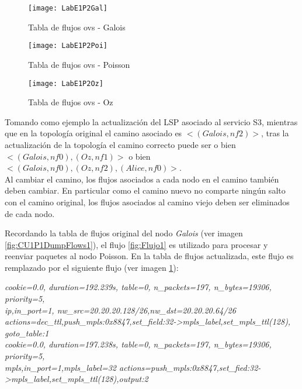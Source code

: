 \newpage
\begin{figure}[h] 
\centering    
\texttt{[image: LabE1P2Gal]}
\caption[Tabla de flujos ovs - Galois]{Tabla de flujos ovs - Galois}
\label{fig:CU1P2DumpFlows2}
\end{figure}

\begin{figure}[h] 
\centering    
\texttt{[image: LabE1P2Poi]}
\caption[Tabla de flujos ovs - Poisson]{Tabla de flujos ovs - Poisson}
\label{fig:CU1P2DumpFlows3}
\end{figure}

\newpage
\begin{figure}[ht!] 
\centering    
\texttt{[image: LabE1P2Oz]}
\caption[Tabla de flujos ovs - Oz]{Tabla de flujos ovs - Oz}
\label{fig:CU1P2DumpFlows4}
\end{figure}

Tomando como ejemplo la actualizaci\'on del LSP asociado al servicio S3, mientras que en la topolog\'ia original el camino asociado es $<(Galois, nf2)>$, tras la actualizaci\'on de la topolog\'ia el camino correcto puede ser o bien $<(Galois, nf0),(Oz, nf1)>$ o bien \\ $<(Galois, nf0), (Oz, nf2), (Alice, nf0)>$.\\

Al cambiar el camino, los flujos asociados a cada nodo en el camino tambi\'en deben cambiar. En particular como el camino nuevo no comparte ning\'un salto con el camino original, los flujos asociados al camino viejo deben ser eliminados de cada nodo.

Recordando la tabla de flujos original del nodo \textit{Galois} (ver imagen \ref{fig:CU1P1DumpFlows1}), el flujo \ref{fig:Flujo1} es utilizado para procesar y reenviar paquetes al nodo Poisson. En la tabla de flujos actualizada, este flujo es remplazado por el siguiente flujo (ver imagen \ref{fig:CU1P2DumpFlows2}):

\begin{center}
\textit{cookie=0.0, duration=192.239s, table=0, n\_packets=197, n\_bytes=19306, priority=5, \\
ip,in\_port=1, nw\_src=20.20.20.128/26,nw\_dst=20.20.20.64/26 \\
actions=dec\_ttl,push\_mpls:0x8847,set\_field:32->mpls\_label,set\_mpls\_ttl(128), goto\_table:1 \\
cookie=0.0, duration=197.238s, table=0, n\_packets=197, n\_bytes=19306, priority=5, \\
mpls,in\_port=1,mpls\_label=32 actions=push\_mpls:0x8847,set\_fied:32->mpls\_label,set\_mpls\_ttl(128),output:2}
\end{center}

